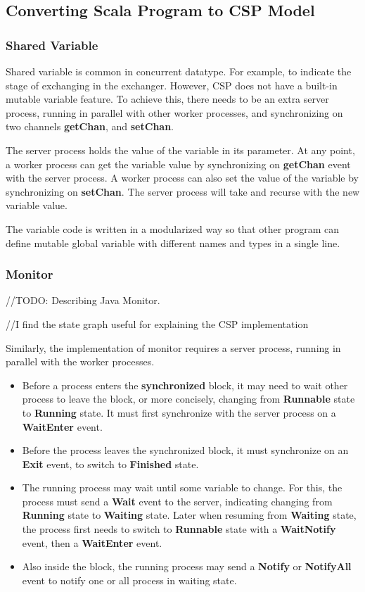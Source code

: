 \documentclass{article}
\begin{document}
\subsection{Converting Scala Program to CSP Model}
\subsubsection{Shared Variable}
Shared variable is common in concurrent datatype. For example, to indicate the stage of exchanging in the exchanger. However, CSP does not have a built-in mutable variable feature. To achieve this, there needs to be an extra server process, running in parallel with other worker processes, and synchronizing on two channels \textbf{getChan}, and \textbf{setChan}. 

The server process holds the value of the variable in its parameter. At any point, a worker process can get the variable value by synchronizing on \textbf{getChan} event with the server process. A worker process can also set the value of the variable by synchronizing on \textbf{setChan}. The server process will take and recurse with the new variable value.  

The variable code is written in a modularized way so that other program can define mutable global variable with different names and types in a single line. 


\subsubsection{Monitor}
//TODO: Describing Java Monitor.

//I find the state graph useful for explaining the CSP implementation

Similarly, the implementation of monitor requires a server process, running in parallel with the worker processes. 

\begin{itemize}
    \item Before a process enters the \textbf{synchronized} block, it may need to wait other process to leave the block, or more concisely, changing from \textbf{Runnable} state to \textbf{Running} state. It must first synchronize with the server process on a \textbf{WaitEnter} event.
    \item Before the process leaves the synchronized block, it must synchronize on an \textbf{Exit} event, to switch to \textbf{Finished} state.
    \item The running process may wait until some variable to change. For this, the process must send a \textbf{Wait} event to the server, indicating changing from \textbf{Running} state to \textbf{Waiting} state. Later when resuming from \textbf{Waiting} state, the process first needs to switch to \textbf{Runnable} state with a \textbf{WaitNotify} event, then a \textbf{WaitEnter} event.
    \item Also inside the block, the running process may send a \textbf{Notify} or \textbf{NotifyAll} event to notify one or all process in waiting state.
\end{itemize}
\end{document}
